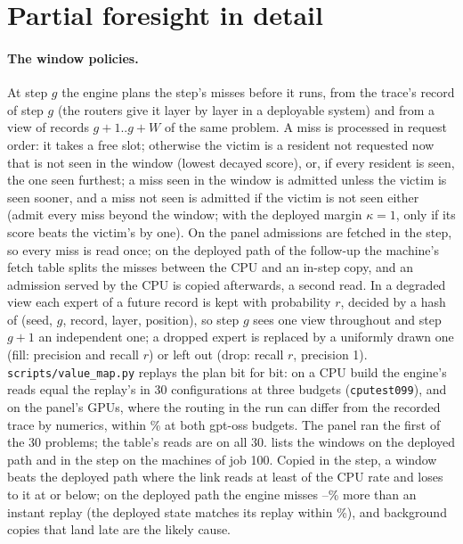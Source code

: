 \section{Partial foresight in detail}\label{app:value}



\paragraph{The window policies.} At step $g$ the engine plans the step's misses before it runs, from the trace's record
of step $g$ (the routers give it layer by layer in a deployable system) and from a view of records $g{+}1..g{+}W$ of the
same problem. A miss is processed in request order: it takes a free slot; otherwise the victim is a resident not
requested now that is not seen in the window (lowest decayed score), or, if every resident is seen, the one seen
furthest; a miss seen in the window is admitted unless the victim is seen sooner, and a miss not seen is admitted if
the victim is not seen either (admit every miss beyond the window; with the deployed margin $\kappa{=}1$, only if its
score beats the victim's by one). On the panel admissions are fetched in the step, so every miss is read once; on the
deployed path of the follow-up the machine's fetch table splits the misses between the CPU and an in-step copy, and an
admission served by the CPU is copied afterwards, a second read. In a degraded view each
expert of a future record is kept with probability $r$, decided by a hash of (seed, $g$, record, layer, position), so
step $g$ sees one view throughout and step $g{+}1$ an independent one; a dropped expert is replaced by a uniformly drawn
one (fill: precision and recall $r$) or left out (drop: recall $r$, precision 1). \texttt{scripts/value\_map.py}
replays the plan bit for bit: on a CPU build the engine's reads equal the replay's in 30 configurations at three budgets
(\texttt{cputest099}), and on the panel's GPUs, where the routing in the run can differ from the recorded trace by
numerics, within \pnReplayMax\% at both gpt-oss budgets. The panel ran the first \pnProblems{} of the 30 problems; the
table's reads are on all 30.  lists the windows on the deployed path and in the step on the machines of
job 100. Copied in the step, a window beats the deployed path where the link reads at least \jaPathHighRatioMin{} of the
CPU rate and loses to it at \jaPathLowRatioMax{} or below; on the deployed path the engine misses
\jaReplayDevMin--\jaReplayDevMax\% more than an instant replay (the deployed state matches its replay within
\jaBaseReplayDevMax\%), and background copies that land late are the likely cause.

